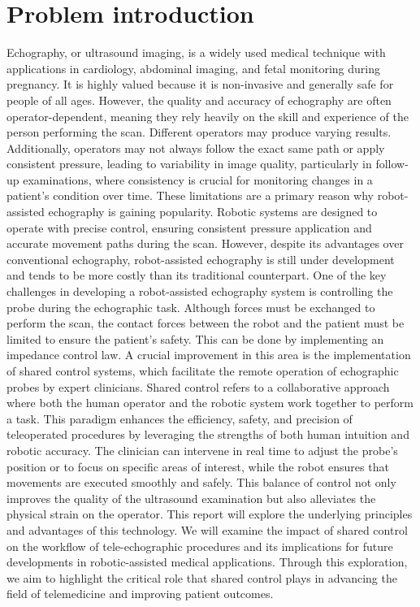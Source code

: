 \documentclass{article}
\begin{document}
\section{Problem introduction}
Echography, or ultrasound imaging, is a widely used medical technique with applications in cardiology, abdominal imaging, and fetal monitoring during pregnancy. It is highly valued because it is non-invasive and generally safe for people of all ages.
However, the quality and accuracy of echography are often operator-dependent, meaning they rely heavily on the skill and experience of the person performing the scan. Different operators may produce varying results. Additionally, operators may not always follow the exact same path or apply consistent pressure, leading to variability in image quality, particularly in follow-up examinations, where consistency is crucial for monitoring changes in a patient's condition over time.
These limitations are a primary reason why robot-assisted echography is gaining popularity. Robotic systems are designed to operate with precise control, ensuring consistent pressure application and accurate movement paths during the scan. 
However, despite its advantages over conventional echography, robot-assisted echography is still under development and tends to be more costly than its traditional counterpart. One of the key challenges in developing a robot-assisted echography system is controlling the probe during the echographic task. Although forces must be exchanged to perform the scan, the contact forces between the robot and the patient must be limited to ensure the patient’s safety. This can be done by implementing an impedance control law.
A crucial improvement in this area is the implementation of shared control systems, which facilitate the remote operation of echographic probes by expert clinicians. Shared control refers to a collaborative approach where both the human operator and the robotic system work together to perform a task. This paradigm enhances the efficiency, safety, and precision of teleoperated procedures by leveraging the strengths of both human intuition and robotic accuracy.
The clinician can intervene in real time to adjust the probe's position or to focus on specific areas of interest, while the robot ensures that movements are executed smoothly and safely. This balance of control not only improves the quality of the ultrasound examination but also alleviates the physical strain on the operator.
This report will explore the underlying principles and advantages of this technology. We will examine the impact of shared control on the workflow of tele-echographic procedures and its implications for future developments in robotic-assisted medical applications. Through this exploration, we aim to highlight the critical role that shared control plays in advancing the field of telemedicine and improving patient outcomes.
\end{document}
